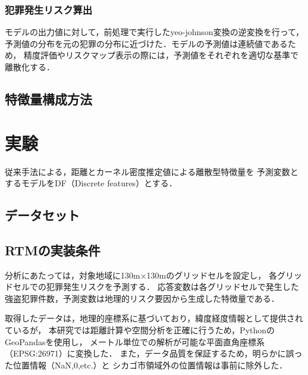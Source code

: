 \documentclass[12pt,a4paper,oneside]{jsbook}
\theoremstyle{plain}
\begin{document}
\subsection{犯罪発生リスク算出}
モデルの出力値に対して，前処理で実行したyeo-johnson変換の逆変換を行って，
予測値の分布を元の犯罪の分布に近づけた．モデルの予測値は連続値であるため，
精度評価やリスクマップ表示の際には，予測値をそれぞれを適切な基準で離散化する．
\section{特徴量構成方法}
\label{feature-configuration}




\chapter{実験}
\label{chapter_4}

従来手法\citep{caplan2015risk}による，距離とカーネル密度推定値\citep{bishop2007}による離散型特徴量を
予測変数とするモデルをDF（Discrete features）とする．
\section{データセット}


\section{RTMの実装条件}
分析にあたっては，対象地域に130m×130mのグリッドセルを設定し，
各グリッドセルでの犯罪発生リスクを予測する．
応答変数は各グリッドセルで発生した強盗犯罪件数，予測変数は地理的リスク要因から生成した特徴量である．

取得したデータは，地理的座標系に基づいており，緯度経度情報として提供されているが，
本研究では距離計算や空間分析を正確に行うため，PythonのGeoPandas\cite{geopandas}を使用し，
メートル単位での解析が可能な平面直角座標系（EPSG:26971）に変換した．
また，データ品質を保証するため，明らかに誤った位置情報（NaN,0,etc.）と
シカゴ市領域外の位置情報は事前に除外した．
\end{document}
